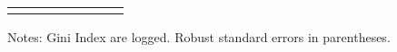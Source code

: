 \begin{table}[H]
{\begin{threeparttable}
\begin{tabular}{lccccccc}
\bottomrule[0.5pt]                                                                               \label{tab:table2}                                                                       \end{tabular}                                                                                                    \vspace{-13pt}                                                                                           \begin{tablenotes}[flushleft]{\setlength{\itemindent}{-3pt}}          \small                                                                                                           \item Notes: Gini Index are logged. Robust standard errors in   parentheses.            \end{tablenotes}                                                                                         \end{threeparttable}                                                                             }                                                                                                                        \end{table}
